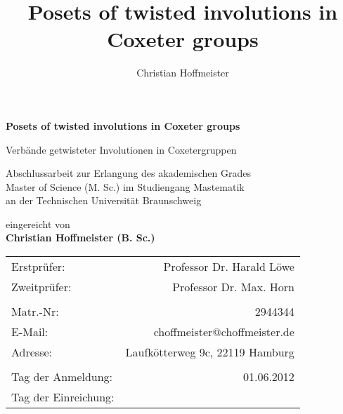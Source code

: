 \title{Posets of twisted involutions in Coxeter groups}
\author{Christian Hoffmeister}

\begin{titlepage}
\begin{center}
{\Large \bf Posets of twisted involutions in Coxeter groups}

{\large Verbände getwisteter Involutionen in Coxetergruppen}

\vspace*{4cm}
Abschlussarbeit zur Erlangung des akademischen Grades\\Master of Science (M. Sc.) im Studiengang Mastematik\\an der Technischen Universität Braunschweig

\vspace*{4cm}
eingereicht von \\
{\Large \bf Christian Hoffmeister (B. Sc.)}

\vspace*{4cm}
\begin{tabular}{lr}
	Erstprüfer: & Professor Dr. Harald Löwe \\
	Zweitprüfer: & Professor Dr. Max. Horn \\
	\vspace*{0.5em} & \\
	Matr.-Nr: & 2944344 \\
	E-Mail: & choffmeister@choffmeister.de \\
	Adresse: & Laufkötterweg 9c, 22119 Hamburg \\
	\vspace*{0.5em} & \\
	Tag der Anmeldung: & 01.06.2012 \\
	Tag der Einreichung: & \\
\end{tabular}
\end{center}
\end{titlepage}